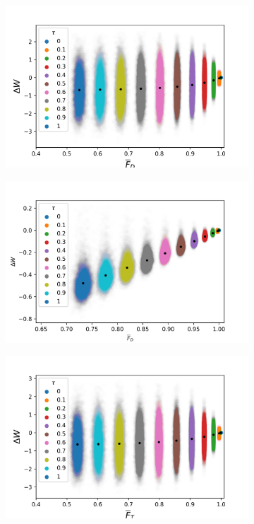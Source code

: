 \begin{figure}[h]
	\centering
	\begin{subfigure}{0.4\textwidth}
		\centering
		\includegraphics[width=\textwidth]{img/noisy_drive_bi_true_3}
	\end{subfigure}
	\begin{subfigure}{0.4\textwidth}
	\centering
	\includegraphics[width=\textwidth]{img/noisy_drive_dt_1}
	\end{subfigure}
	\begin{subfigure}{0.4\textwidth}
		\centering
		\includegraphics[width=\textwidth]{img/noisy_trans_bi_true_3}

\end{subfigure}
\end{figure}
